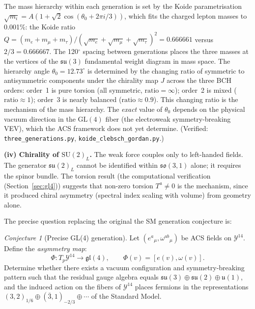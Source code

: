 \documentclass[11pt,a4paper]{article}
\theoremstyle{plain}
\theoremstyle{definition}
\theoremstyle{remark}
\newtheorem{conjecture}[theorem]{Conjecture}
\begin{document}
The mass hierarchy within each generation is set by the
Koide parametrisation $\sqrt{m_i} = A(1 + \sqrt{2}\cos(\theta_0 + 2\pi i/3))$,
which fits the charged lepton masses to 0.001\%:
the Koide ratio $Q = (m_e + m_\mu + m_\tau)/(\sqrt{m_e} + \sqrt{m_\mu} + \sqrt{m_\tau})^2 = 0.666661$ versus $2/3 = 0.666667$.
The 120$^\circ$ spacing between generations
places the three masses at the vertices of the $\mathfrak{su}(3)$
fundamental weight diagram in mass space.
The hierarchy angle $\theta_0 = 12.73^\circ$ is determined by
the changing ratio of symmetric to antisymmetric components
under the chirality map $J$ across the three BCH orders:
order~1 is pure torsion (all symmetric, $\mathrm{ratio} = \infty$);
order~2 is mixed ($\mathrm{ratio} \approx 1$);
order~3 is nearly balanced ($\mathrm{ratio} \approx 0.9$).
This changing ratio is the mechanism of the mass hierarchy.
The \emph{exact} value of $\theta_0$ depends on the physical
vacuum direction in the $\mathrm{GL}(4)$ fiber (the electroweak
symmetry-breaking VEV), which the ACS framework does not yet determine.
(Verified: \texttt{three\_generations.py}, \texttt{koide\_clebsch\_gordan.py}.)

\medskip
\noindent\textbf{(iv) Chirality of $\mathrm{SU}(2)_L$.}  
The weak force couples only to left-handed fields.  
The generator $\mathfrak{su}(2)_L$ cannot be identified within $\mathfrak{so}(3,1)$ 
alone; it requires the spinor bundle.  
The torsion result (the computational verification (Section~\ref{sec:gl4})) suggests that 
non-zero torsion $T^a \neq 0$ is the mechanism, 
since it produced chiral asymmetry (spectral index scaling with volume) 
from geometry alone.

\medskip

The precise question replacing the original the SM generation conjecture is:

\begin{conjecture}[Precise GL(4) generation]\label{conj:gl4-precise}
Let $(e^a{}_\mu, \omega^{ab}{}_\mu)$ be ACS fields on $\mathcal{Y}^{14}$.  
Define the \emph{asymmetry map}:
\[
  \Phi: T_p\mathcal{Y}^{14} \to \mathfrak{gl}(4), \qquad
  \Phi(v) = [e(v), \omega(v)].
\]
Determine whether there exists a vacuum configuration and symmetry-breaking 
pattern such that the residual gauge algebra equals 
$\mathfrak{su}(3) \oplus \mathfrak{su}(2) \oplus \mathfrak{u}(1)$, 
and the induced action on the fibers of $\mathcal{Y}^{14}$ places fermions in 
the representations $(3,2)_{1/6} \oplus (\bar{3},1)_{-2/3} \oplus \cdots$ 
of the Standard Model.
\end{conjecture}
\end{document}
